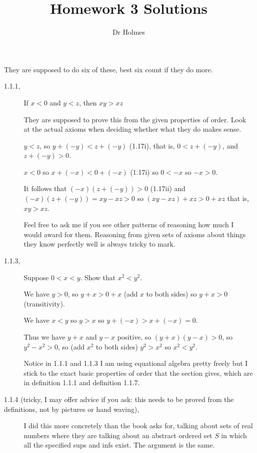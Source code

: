 \documentclass[12pt]{article}
\title{Homework 3 Solutions}
\author{Dr Holmes}
\begin{document}
\maketitle

They are supposed to do six of these, best six count if they do more.

\begin{description}

\item [1.1.1,] 

If $x<0$ and $y<z$, then $xy>xz$

They are supposed to prove this from the given properties of order.  Look at the actual axioms when deciding whether what they do makes sense.

$y<z$, so $y+(-y) < z+(-y)$ (1.17i), that is, $0 < z+(-y)$, and $z+(-y)>0$.

$x<0$ so $x+(-x) < 0+(-x)$ (1.17i) so $0<-x$ so $-x>0$.

It follows that $(-x)(z+(-y))>0$ (1.17ii) and $(-x)(z+(-y)) = xy-xz>0$ so $(xy -xz) + xz > 0+xz$ that is, $xy>xz$.

Feel free to ask me if you see other patterns of reasoning how much I would award for them.  Reasoning from given sets of axioms
about things they know perfectly well is always tricky to mark.


\item[1.1.3,]

Suppose $0<x<y$.  Show that $x^2<y^2$.

We have $y>0$, so $y+x>0+x$ (add $x$ to both sides) so $y+x>0$ (transitivity).

We have $x<y$ so $y>x$ so $y+(-x)>x+(-x) = 0$.

Thus we have $y+x$ and $y-x$ positive, so $(y+x)(y-x)>0$, so $y^2-x^2>0$, so (add $x^2$ to both sides) $y^2>x^2$ so $x^2<y^2$.

Notice in 1.1.1 and 1.1.3 I am using equational algebra pretty freely but I stick to the exact basic properties of order that the section gives, which
are in definition 1.1.1 and definition 1.1.7.


 \item[1.1.4 (tricky, I may offer advice if you ask: this needs to be proved from the definitions, not by pictures or hand waving),]

I did this more concretely than the book asks for, talking about sets of real numbers where they are talking about an abstract ordered set
$S$ in which all the specified sups and infs exist.  The argument is the same.


\end{description}
\end{document}

